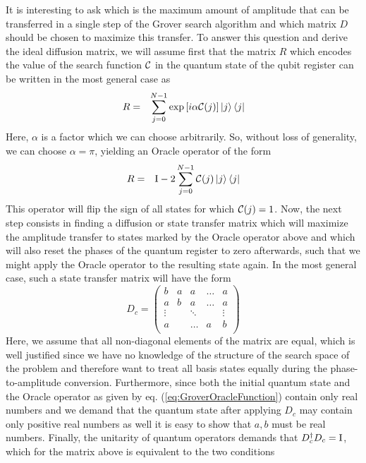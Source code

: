 It is interesting to ask which is the maximum amount of amplitude that can be transferred in a single step of the Grover search algorithm and which matrix $D$ should be chosen to maximize this transfer. To answer this question and derive the ideal diffusion matrix, we will assume first that the matrix $R$ which encodes the value of the search function $\Or$ in the quantum state of the qubit register can be written in the most general case as
%
\begin{eqnarray}
R & = & \sum\limits_{j=0}^{N-1}\exp{\left[i\alpha\Or(j)\right]}\ket{j}\bra{j} \label{eq:GroverOracleFunctions}
\end{eqnarray}
%
Here, $\alpha$ is a factor which we can choose arbitrarily. So, without loss of generality, we can choose $\alpha = \pi$, yielding an Oracle operator of the form
%
\begin{eqnarray}
R & = & \begin{mathrm}I\end{mathrm}-2\sum\limits_{j=0}^{N-1} \Or(j)\ket{j}\bra{j} \label{eq:GroverOracleFunction}
\end{eqnarray}
%
This operator will flip the sign of all states for which $\Or(j) = 1$. Now, the next step consists in finding a diffusion or state transfer matrix which will maximize the amplitude transfer to states marked by the Oracle operator above and which will also reset the phases of the quantum register to zero afterwards, such that we might apply the Oracle operator to the resulting state again. In the most general case, such a state transfer matrix will have the form
%
\begin{equation}
D_c = \left(	
	\begin{array}{ccccc}
		b & a & a & \hdots & a \\
		a & b & a & \hdots & a \\
		\vdots & & \ddots &  &\vdots \\
		a & & \hdots & a & b \\
	\end{array}
\right)
\end{equation}
%
Here, we assume that all non-diagonal elements of the matrix are equal, which is well justified since we have no knowledge of the structure of the search space of the problem and therefore want to treat all basis states equally during the phase-to-amplitude conversion. Furthermore, since both the initial quantum state and the Oracle operator as given by eq. (\ref{eq:GroverOracleFunction}) contain only real numbers and we demand that the quantum state after applying $D_c$ may contain only positive real numbers as well it is easy to show that $a,b$ must be real numbers. Finally, the unitarity of quantum operators demands that $D_c^\dagger D_c = \begin{mathrm}I\end{mathrm}$, which for the matrix above is equivalent to the two conditions
